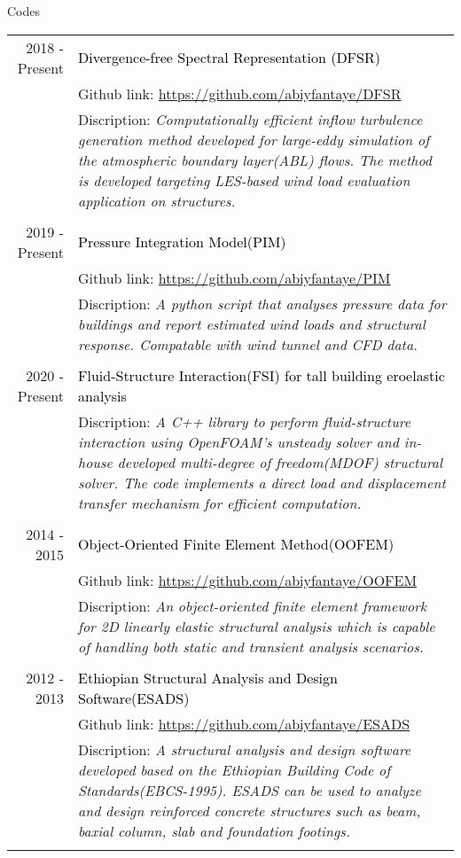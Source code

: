 \documentclass{resume} %
\begin{document}
\begin{rSection}{Codes}
  \begin{tabular}{r|p{14cm}}
  
  \footnotesize{2018 - Present} & \textcolor{black} {Divergence-free Spectral Representation (DFSR)}\\& \footnotesize  {Github link}: \url{https://github.com/abiyfantaye/DFSR} \\& \footnotesize{Discription}: \emph{Computationally efficient inflow turbulence generation method developed for large-eddy simulation of the atmospheric boundary layer(ABL) flows. The method is developed targeting LES-based wind load evaluation application on structures.} \\ \\
  
  \footnotesize{2019 - Present} & \textcolor{black} {Pressure Integration Model(PIM)}\\& \footnotesize  {Github link}: \url{https://github.com/abiyfantaye/PIM} \\& \footnotesize{Discription}: \emph{A python script that analyses pressure data for buildings and report estimated wind loads and structural response. Compatable with wind tunnel and CFD data.} \\ \\

  \footnotesize{2020 - Present} & \textcolor{black} {Fluid-Structure Interaction(FSI) for tall building eroelastic analysis}\\& \footnotesize{Discription}: \emph{A C++ library to perform fluid-structure interaction using OpenFOAM's unsteady solver and in-house developed multi-degree of freedom(MDOF) structural solver. The code implements a direct load and displacement transfer mechanism for efficient computation.} \\ \\

  \footnotesize{2014 - 2015} & \textcolor{black} {Object-Oriented Finite Element Method(OOFEM)}\\& \footnotesize  {Github link}: \url{https://github.com/abiyfantaye/OOFEM} \\& \footnotesize{Discription}: \emph{An object-oriented finite element framework for 2D linearly elastic structural analysis which is capable of handling both static and transient analysis scenarios.} \\ \\
  
  \footnotesize{2012 - 2013} & \textcolor{black} {Ethiopian Structural Analysis and Design Software(ESADS)}\\& \footnotesize  {Github link}: \url{https://github.com/abiyfantaye/ESADS} \\& \footnotesize{Discription}: \emph{A structural analysis and design software developed based on the Ethiopian Building Code of Standards(EBCS-1995). ESADS can be used to analyze and design reinforced concrete structures such as beam, baxial column, slab and foundation footings.} \\ \\


\end{tabular}
\end{rSection}
\end{document}
